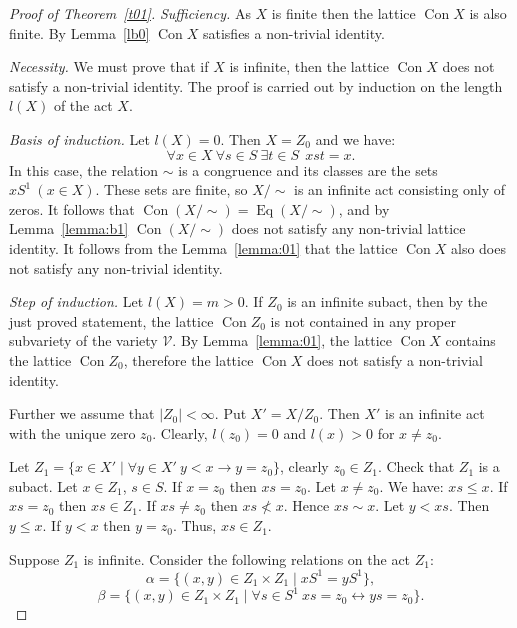 \documentclass{birkau}
\numberwithin{equation}{section}
\theoremstyle{plain}
\theoremstyle{definition}
\DeclareMathOperator{\Con}{Con}
\DeclareMathOperator{\Eq}{Eq}
\begin{document}
	\begin{proof}[Proof of Theorem~\ref{t01}]
	    \textit{Sufficiency.} As $X$ is finite then the lattice $\Con X$ is also finite. By Lemma~\ref{lb0} $\Con X$ satisfies a non-trivial identity.
	
		\textit{Necessity.} We must prove that if $X$ is infinite, then the lattice $\Con X$ does not satisfy a non-trivial identity. The proof is carried out by induction on the length $l(X)$ of the act $X$.
		
		\textit{Basis of induction.} Let $l(X) = 0$. Then $X = Z_0$ and we have: $$ \forall x \in X \ \forall s \in S \ \exists t \in S \ \ xst = x. $$ In this case, the relation $\sim$ is a congruence and its classes are the sets $xS^1\ (x \in X)$. These sets are finite, so ${X}/{\sim}$ is an infinite act consisting only of zeros. It follows that $\Con({X}/{\sim})=\Eq({X}/{\sim})$, and by Lemma~\ref{lemma:b1} $\Con({X}/{\sim})$ does not satisfy any non-trivial lattice identity. It follows from the Lemma~\ref{lemma:01} that the lattice $\Con X$ also does not satisfy any non-trivial identity.
		
		\textit{Step of induction.} Let $l(X) = m > 0$. If $Z_0$ is an infinite subact, then by the just proved statement, the lattice $\Con Z_0$ is not contained in any proper subvariety of the variety $\mathcal{V}$. By Lemma~\ref{lemma:01}, the lattice $\Con X$ contains the lattice $\Con Z_0$, therefore the lattice $\Con X$ does not satisfy a non-trivial identity.
		
		Further we assume that $|Z_0| < \infty$. Put $X'={X}/{Z_0}$. Then $X'$ is an infinite act with the unique zero $z_0$. Clearly,  $l(z_0) = 0$ and $l(x) > 0$ for $x \neq z_0$.
		
		Let $Z_1 = \{x \in X' \mid \forall y  \in X' \ y < x \rightarrow y = z_0\}$, clearly $z_0 \in Z_1$. Check that $Z_1$ is a subact. Let $x \in Z_1$, $s \in S$. If $x = z_0$ then $xs = z_0$. Let $x \neq z_0$. We have: $xs \leqslant x$. If $xs = z_0$ then $xs \in Z_1$. If $xs \neq z_0$ then $xs \not < x$. Hence $xs \sim x$. Let $y < xs$. Then $y \leqslant x$. If $y < x$ then $y = z_0$. Thus, $xs \in Z_1$.
		
		Suppose $ Z_1 $ is infinite. Consider the following relations on the act $Z_1$: $$ \alpha = \{ (x,y) \in Z_1 \times Z_1 \mid xS^1 = yS^1 \}, $$ $$ \beta = \{ (x,y) \in Z_1 \times Z_1 \mid \forall s \in S^1 \ xs = z_0 \leftrightarrow ys = z_0 \}. $$
		

\end{proof}
\end{document}
